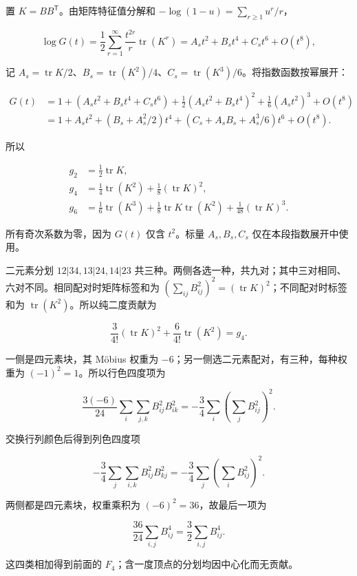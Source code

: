 \documentclass[11pt,a4paper]{article}
\begin{document}
置 \(K=BB^{\mathsf T}\)。由矩阵特征值分解和 \(-\log(1-u)=\sum_{r\ge1}u^r/r\)，

\[
\log G(t)=\frac12\sum_{r=1}^{\infty}\frac{t^{2r}}r\operatorname{tr}(K^r)
=A_st^2+B_st^4+C_st^6+O(t^8),
\]

记 \(A_s=\operatorname{tr}K/2\)、\(B_s=\operatorname{tr}(K^2)/4\)、\(C_s=\operatorname{tr}(K^3)/6\)。将指数函数按幂展开：

\[
\begin{aligned}
G(t)
&=1+(A_st^2+B_st^4+C_st^6)
+\frac12(A_st^2+B_st^4)^2+\frac16(A_st^2)^3+O(t^8)\\
&=1+A_st^2+(B_s+A_s^2/2)t^4
+(C_s+A_sB_s+A_s^3/6)t^6+O(t^8).
\end{aligned}
\]

所以

\[
\begin{aligned}
g_2&=\tfrac12\operatorname{tr}K,\\
g_4&=\tfrac14\operatorname{tr}(K^2)+\tfrac18(\operatorname{tr}K)^2,\\
g_6&=\tfrac16\operatorname{tr}(K^3)
+\tfrac18\operatorname{tr}K\operatorname{tr}(K^2)
+\tfrac1{48}(\operatorname{tr}K)^3.
\end{aligned}
\]

所有奇次系数为零，因为 \(G(t)\) 仅含 \(t^2\)。标量 \(A_s,B_s,C_s\) 仅在本段指数展开中使用。

二元素分划 \(12|34,13|24,14|23\) 共三种。两侧各选一种，共九对；其中三对相同、六对不同。相同配对时矩阵标签和为 \((\sum_{ij}B_{ij}^2)^2=(\operatorname{tr}K)^2\)；不同配对时标签和为 \(\operatorname{tr}(K^2)\)。所以纯二度贡献为

\[
\frac3{4!}(\operatorname{tr}K)^2+\frac6{4!}\operatorname{tr}(K^2)=g_4.
\]

一侧是四元素块，其 Möbius 权重为 \(-6\)；另一侧选二元素配对，有三种，每种权重为 \((-1)^2=1\)。所以行色四度项为

\[
\frac{3(-6)}{24}\sum_i\sum_{j,k}B_{ij}^2B_{ik}^2
=-\frac34\sum_i\left(\sum_jB_{ij}^2\right)^2.
\]

交换行列颜色后得到列色四度项

\[
-\frac34\sum_j\sum_{i,k}B_{ij}^2B_{kj}^2
=-\frac34\sum_j\left(\sum_iB_{ij}^2\right)^2.
\]

两侧都是四元素块，权重乘积为 \((-6)^2=36\)，故最后一项为

\[
\frac{36}{24}\sum_{i,j}B_{ij}^4=\frac32\sum_{i,j}B_{ij}^4.
\]

这四类相加得到前面的 \(F_4\)；含一度顶点的分划均因中心化而无贡献。
\end{document}
